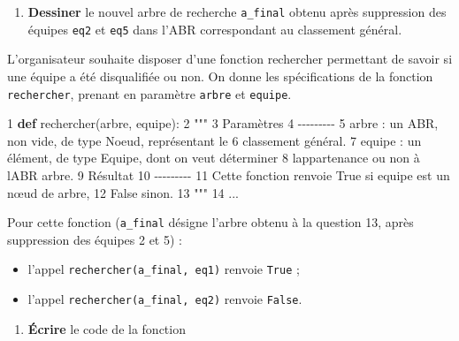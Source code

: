 \documentclass[
  paper=a4,
  ,captions=tableheading
]{scrartcl}
\newenvironment{Shaded}{}{}
\newcommand{\DecValTok}[1]{\textcolor[rgb]{0.25,0.63,0.44}{#1}}
\newcommand{\KeywordTok}[1]{\textcolor[rgb]{0.00,0.44,0.13}{\textbf{#1}}}
\newcommand{\NormalTok}[1]{#1}
\newcommand{\StringTok}[1]{\textcolor[rgb]{0.25,0.44,0.63}{#1}}
\providecommand{\tightlist}{%
  \setlength{\itemsep}{0pt}\setlength{\parskip}{0pt}}
\begin{document}
\begin{enumerate}
\def\labelenumi{\arabic{enumi}.}
\setcounter{enumi}{12}
\tightlist
\item
  \textbf{Dessiner} le nouvel arbre de recherche \texttt{a\_final}
  obtenu après suppression des équipes \texttt{eq2} et \texttt{eq5} dans
  l'ABR correspondant au classement général.
\end{enumerate}

L'organisateur souhaite disposer d'une fonction rechercher permettant de
savoir si une équipe a été disqualifiée ou non. On donne les
spécifications de la fonction \texttt{rechercher}, prenant en paramètre
\texttt{arbre} et \texttt{equipe}.

\begin{Shaded}
\begin{Highlighting}[]
\DecValTok{1} \KeywordTok{def}\NormalTok{ rechercher(arbre, equipe):}
\DecValTok{2}   \StringTok{"""}
\StringTok{3       Paramètres}
\StringTok{4       {-}{-}{-}{-}{-}{-}{-}{-}{-}}
\StringTok{5           arbre : un ABR, non vide, de type Noeud, représentant le}
\StringTok{6           classement général.}
\StringTok{7           equipe : un élément, de type Equipe, dont on veut déterminer}
\StringTok{8           l\textquotesingle{}appartenance ou non à l\textquotesingle{}ABR arbre.}
\StringTok{9       Résultat}
\StringTok{10      {-}{-}{-}{-}{-}{-}{-}{-}{-}}
\StringTok{11          Cette fonction renvoie True si equipe est un nœud de arbre,}
\StringTok{12          False sinon.}
\StringTok{13 """}
\DecValTok{14}\NormalTok{ ...}
\end{Highlighting}
\end{Shaded}

Pour cette fonction (\texttt{a\_final} désigne l'arbre obtenu à la
question 13, après suppression des équipes 2 et 5) :

\begin{itemize}
\tightlist
\item
  l'appel \texttt{rechercher(a\_final,\ eq1)} renvoie \texttt{True} ;
\item
  l'appel \texttt{rechercher(a\_final,\ eq2)} renvoie \texttt{False}.
\end{itemize}

\begin{enumerate}
\def\labelenumi{\arabic{enumi}.}
\setcounter{enumi}{13}
\tightlist
\item
  \textbf{Écrire} le code de la fonction
\end{enumerate}
\end{document}
